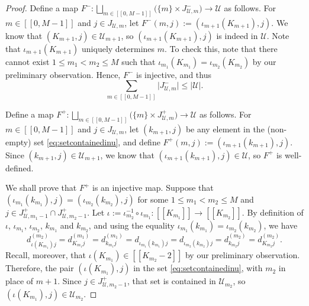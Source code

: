 \documentclass[11pt]{amsart}
\theoremstyle{definition}
\renewcommand{\leq}{\leqslant}
\newcommand{\interval}[2]{[\![#1,#2]\!] }
\newcommand{\sinterval}[1]{[\![#1]\!] }
\newcommand{\abs}[1]{\left|#1\right|}
\newcommand{\pcomp}[2]{d_{#1#2}}
\newcommand{\unlit}{\mathcal{U}}
\newcommand{\repK}{K}
\newcommand{\myfunction}{\iota}
\begin{document}
\begin{proof}
Define a map $F^- : \bigsqcup_{m\in \interval{0}{M-1}} \big(\{m\} \times J_{\unlit,m}^- \big) \to \unlit$ as follows. For $m\in \interval{0}{M-1}$ and $j\in J_{\unlit,m}$, let $F^-(m,j) := (\myfunction_{m+1}(\repK_{m+1}),j)$. We know that $(\repK_{m+1},j)\in \unlit_{m+1}$, so $(\myfunction_{m+1}(\repK_{m+1}),j)$ is indeed in $\unlit$. Note that $\myfunction_{m+1}(\repK_{m+1})$ uniquely determines $m$. To check this, note that there cannot exist $1\leq m_1 < m_2\leq M$ such that $\myfunction_{m_1}(\repK_{m_1}) = \myfunction_{m_2}(\repK_{m_2})$ by our preliminary observation. Hence, $F^-$ is injective, and thus 
\begin{equation*}
	\sum_{m\in \interval{0}{M-1}} \lvert{J_{\unlit,m}^-}\rvert \leq \abs{\unlit}.
\end{equation*}
	 
Define a map $F^+ : \bigsqcup_{m\in \interval{0}{M-1}} \big(\{m\} \times J_{\unlit,m}^+\big) \to \unlit$ as follows. For $m\in \interval{0}{M-1}$ and ${j\in J_{\unlit,m}}$, let $(k_{m+1},j)$ be any element in the (non-empty) set \cref{eq:setcontainedinu}, and define $F^+(m,j) := (\myfunction_{{m+1}}(k_{m+1}),j)$. Since $(k_{m+1},j)\in \unlit_{m+1}$, we know that $(\myfunction_{{m+1}}(k_{m+1}),j)\in \unlit$, so $F^+$ is well-defined. 
	 
We shall prove that $F^+$ is an injective map. Suppose that ${(\myfunction_{m_1}(k_{m_1}),j) = (\myfunction_{m_2}(k_{m_2}),j)}$ for some ${1\leq m_1<m_2\leq M}$ and $j\in J_{\unlit,m_1-1}^+\cap J_{\unlit,m_2-1}^+$. Let $\myfunction := \myfunction_{m_2}^{-1} \circ \myfunction_{m_1} : \sinterval{\repK_{m_1}} \to \sinterval{\repK_{m_2}}$.	 
By definition of $\myfunction$, $\myfunction_{m_1}$, $\myfunction_{m_2}$, $k_{m_1}$ and $k_{m_2}$, and using the equality $\myfunction_{m_1}(k_{m_1}) = \myfunction_{m_2}(k_{m_2})$, we have
\begin{equation*}
 	\pcomp{\myfunction(\repK_{m_1})}{j}^{(m_2)} = \pcomp{\repK_{m_1}}{j}^{(m_1)} = \pcomp{k_{m_1}}{j}^{(m_1)} = \pcomp{\myfunction_{m_1}(k_{m_1})}{j} = \pcomp{\myfunction_{m_2}(k_{m_2})}{j} = \pcomp{k_{m_2}}{j}^{(m_2)} = \pcomp{\repK_{m_2}}{j}^{(m_2)}.
\end{equation*}
Recall, moreover, that $\myfunction(\repK_{m_1}) \in \sinterval{\repK_{m_2}-2}$ by our preliminary observation. Therefore, the pair $(\myfunction(\repK_{m_1}),j)$ in the set \cref{eq:setcontainedinu}, with $m_2$ in place of $m+1$. Since $j\in  J_{\unlit,m_2-1}^+$, that set is contained in $\unlit_{m_2}$, so $(\myfunction(\repK_{m_1}),j)\in \unlit_{m_2}$. 


\end{proof}
\end{document}
